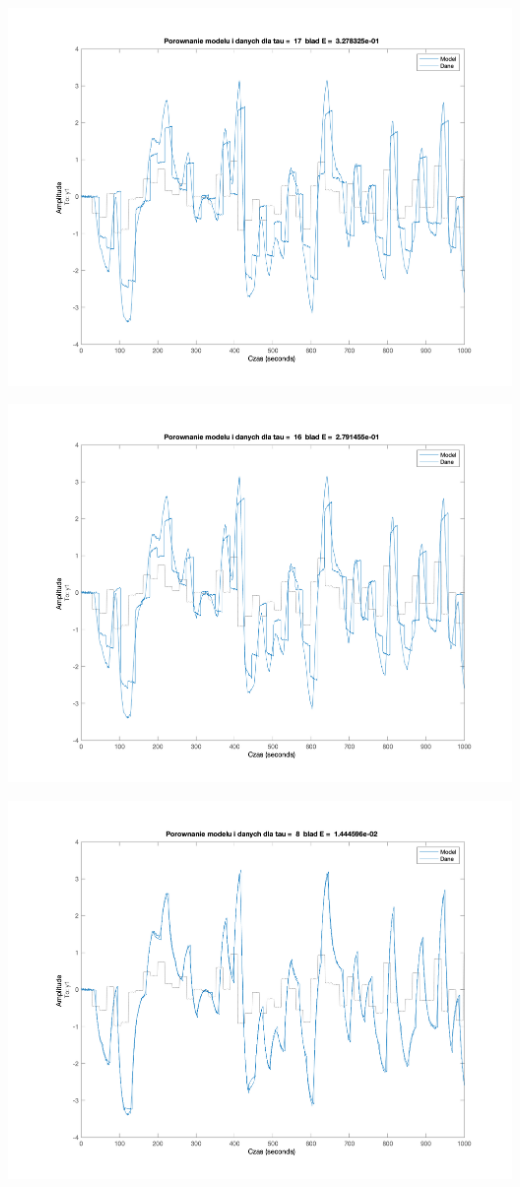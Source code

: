 \documentclass[a4paper, 11pt]{article}
\begin{document}
\begin{enumerate}
 \includegraphics[width=\linewidth]{./ModelsP1/modelTau17.png} 
 
 \includegraphics[width=\linewidth]{./ModelsP1/modelTau16.png} 
 
 \includegraphics[width=\linewidth]{./ModelsP1/modelTau8.png} 
 

\end{enumerate}
\end{document}
